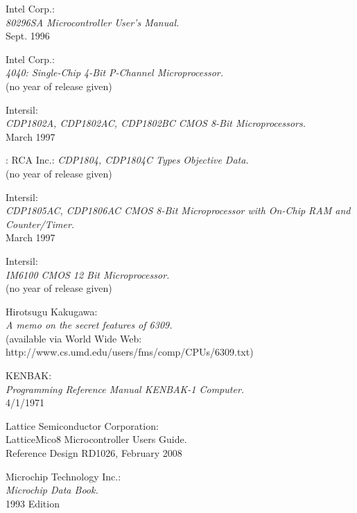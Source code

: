  Intel Corp.: \\
                 {\em 80296SA Microcontroller User's Manual.\/} \\
                 Sept. 1996

 Intel Corp.: \\
                  {\em 4040: Single-Chip 4-Bit P-Channel
                   Microprocessor.\/} \\
                  (no year of release given)

 Intersil: \\
                 {\em CDP1802A, CDP1802AC, CDP1802BC CMOS 8-Bit
                  Microprocessors.\/} \\
                 March 1997

: RCA Inc.:
                 {\em CDP1804, CDP1804C Types Objective Data.} \\
                 (no year of release given)

 Intersil: \\
                 {\em CDP1805AC, CDP1806AC CMOS 8-Bit Microprocessor
                  with On-Chip RAM and Counter/Timer.\/} \\
                 March 1997

 Intersil: \\
                 {\em IM6100 CMOS 12 Bit Microprocessor.\/} \\
                 (no year of release given)

 Hirotsugu Kakugawa: \\
               {\em A memo on the secret features of 6309.\/} \\
    	       (available via World Wide Web: \\
      	       http://www.cs.umd.edu/users/fms/comp/CPUs/6309.txt)

 KENBAK: \\
               {\em Programming Reference Manual KENBAK-1 Computer.} \\
               4/1/1971

 Lattice Semiconductor Corporation: \\
                   {LatticeMico8 Microcontroller Users Guide.\/} \\
                   Reference Design RD1026, February 2008

 Microchip Technology Inc.: \\
                    {\em Microchip Data Book.\/} \\
                    1993 Edition

